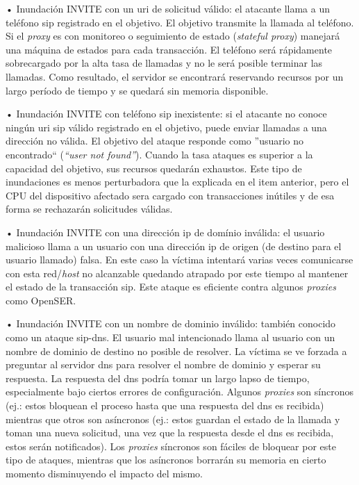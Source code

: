 \documentclass[a4paper,12pt]{report}
\begin{document}
\begin{itemize}
• Inundación INVITE con un \ac{uri} de solicitud válido: el atacante llama a un
teléfono \ac{sip} registrado en el objetivo. El objetivo transmite la llamada al
teléfono. Si el \emph{proxy} es con monitoreo o seguimiento de estado
(\emph{stateful proxy}) manejará una máquina de estados para cada transacción. El
teléfono será rápidamente sobrecargado por la alta tasa de llamadas y no le
será posible terminar las llamadas. Como resultado, el servidor se encontrará
reservando recursos por un largo período de tiempo y se quedará sin memoria
disponible.

• Inundación INVITE con teléfono \ac{sip} inexistente: si el atacante no conoce
ningún \ac{uri} \ac{sip} válido registrado en el objetivo, puede enviar llamadas a una
dirección no válida. El objetivo del ataque responde como ''usuario no
encontrado`` (\emph{``user not found''}). Cuando la tasa ataques es superior a
la capacidad del objetivo, sus recursos quedarán exhaustos. Este tipo de
inundaciones es menos perturbadora que la explicada en el item anterior, pero
el CPU del dispositivo afectado sera cargado con transacciones inútiles y de
esa forma se rechazarán solicitudes válidas.    
                                  
• Inundación INVITE con una dirección \ac{ip} de domínio inválida: el usuario
malicioso llama a un usuario con una dirección \ac{ip} de origen (de destino para el
usuario llamado) falsa. En este caso la víctima intentará varias veces
comunicarse con esta red/\emph{host} no alcanzable quedando atrapado por este
tiempo al mantener el estado de la transacción \ac{sip}. Este ataque es eficiente
contra algunos \emph{proxies} como OpenSER. 

• Inundación INVITE con un nombre de dominio inválido: también conocido como un
ataque \ac{sip}-\ac{dns}. El usuario mal intencionado llama al usuario con un nombre de
dominio de destino no posible de resolver. La víctima se ve forzada a preguntar
al servidor \ac{dns} para resolver el nombre de dominio y esperar su respuesta. La
respuesta del \ac{dns} podría tomar un largo lapso de tiempo, especialmente bajo
ciertos errores de configuración. Algunos \emph{proxies} son síncronos (ej.: estos
bloquean el proceso hasta que una respuesta del \ac{dns} es recibida) mientras que
otros son asíncronos  (ej.: estos guardan el estado de la llamada y toman una
nueva solicitud, una vez que la respuesta desde el \ac{dns} es recibida, estos serán
notificados). Los \emph{proxies} síncronos son fáciles de bloquear por este tipo de
ataques, mientras que los asíncronos borrarán su memoria en cierto momento
disminuyendo el impacto del mismo. 
                                     

\end{itemize}
\end{document}
